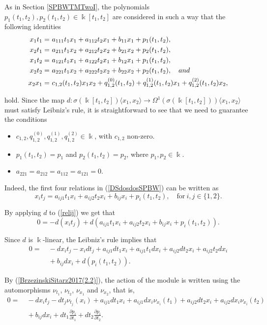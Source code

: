\documentclass{amsart}
\theoremstyle{definition}
\theoremstyle{remark}
\numberwithin{equation}{section}
\begin{document}
As in Section \ref{SPBWTMTwoI}, the polynomials $p_1(t_1, t_2), p_2(t_1, t_2) \in \Bbbk[t_1, t_2]$ are considered in such a way that the following identities 
\begin{align}
    x_1t_1 = &\  a_{111}t_1x_1+a_{112}t_2x_1+b_{11}x_1+ p_1(t_1, t_2),  \notag \\
    x_2t_1  = &\ a_{211}t_1x_2+a_{212}t_2x_2+b_{21}x_2+ p_2(t_1,t_2),  \notag \\
    x_1t_2 = &\ a_{121}t_1x_1+a_{122}t_2x_1+b_{12}x_1+ p_1(t_1,t_2),  \label{DSdosdosSPBW} \\
    x_2t_2  = &\ a_{221}t_1x_2+a_{222}t_2x_2+b_{22}x_2+ p_2(t_1, t_2), \quad {\rm and}  \notag \\
    x_2 x_1 = &\ c_{1, 2}(t_1, t_2)x_1 x_2 + q_{1,2}^{(0)}(t_1, t_2) + q_{1,2}^{(1)}(t_1, t_2)x_1 + q_{1,2}^{(2)}(t_1, t_2)x_2, \notag
\end{align}

hold. Since the map $d:\sigma(\Bbbk[t_1, t_2]) \langle x_1, x_2\rangle\rightarrow \Omega^1(\sigma(\Bbbk[t_1, t_2]))\langle x_1, x_2\rangle$ must satisfy Leibniz's rule, it is straightforward to see that we need to guarantee the conditions
\begin{itemize}
    \item $c_{1,2}, q_{1,2}^{(0)}, q_{1,2}^{(1)}, q_{1,2}^{(2)} \in \Bbbk$, with $c_{1,2}$ non-zero.
    \item $p_1(t_1,t_2)=p_1$ and $p_2(t_1, t_2)=p_2$, where $p_1, p_2 \in \Bbbk$.
    \item $a_{221}=a_{212}=a_{112}=a_{121}=0$.
\end{itemize}
Indeed, the first four relations in {\rm (}\ref{DSdosdosSPBW}{\rm )} can be written as
\begin{equation}\label{relij}
    x_it_j=a_{ij1}t_1x_i+a_{ij2}t_2x_i+b_{ij}x_i+p_i(t_1, t_2), \quad \text{for}\ i,j \in \{1, 2\}.
\end{equation}

By applying $d$ to (\ref{relij}) we get that
\[
0 = -d(x_it_j)+d(a_{ij1}t_1x_i+a_{ij2}t_2x_i+b_{ij}x_i+p_i(t_1, t_2)). 
\]

Since $d$ is $\Bbbk$-linear, the Leibniz's rule implies that 
\begin{align*}
0 = &\ -dx_it_j-x_idt_j+a_{ij1}dt_1x_i+a_{ij1}t_1dx_i+a_{ij2}dt_2x_i+a_{ij2}t_2dx_i \\
    & \ +b_{ij}dx_i+d(p_i(t_1, t_2)). 
\end{align*}

By (\ref{BrzezinskiSitarz2017(2.2)}), the action of the module is written using the automorphisms $\nu_{t_1}$, $\nu_{t_2}$, $\nu_{x_1}$ and $\nu_{x_2}$, that is, 
\begin{align*}
0 = &\ -dx_it_j-dt_j\nu_{t_j}(x_i)+a_{ij1}dt_1x_i+a_{ij1}dx_i\nu_{x_i}(t_1)+a_{ij2}dt_2x_i+a_{ij2}dx_i\nu_{x_i}(t_2) \\
    & \ +b_{ij}dx_i+dt_1\frac{\partial p_i}{\partial t_1}+dt_2\frac{\partial p_i}{\partial t_2}.
\end{align*}
\end{document}
